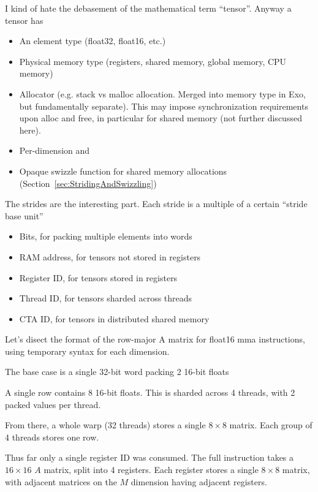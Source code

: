 
I kind of hate the debasement of the mathematical term ``tensor''.
Anyway a tensor has
\begin{itemize}
  \item An element type (float32, float16, etc.)
  \item Physical memory type (registers, shared memory, global memory, CPU memory)
  \item Allocator (e.g. stack vs malloc allocation. Merged into memory type in Exo, but fundamentally separate).
    This may impose synchronization requirements upon alloc and free, in particular for shared memory (not further discussed here).
  \item Per-dimension  and 
  \item Opaque swizzle function for shared memory allocations (Section~\ref{sec:StridingAndSwizzling})
\end{itemize}
The strides are the interesting part.
Each stride is a multiple of a certain ``stride base unit''
\begin{itemize}
  \item Bits, for packing multiple elements into words
  \item RAM address, for tensors not stored in registers
  \item Register ID, for tensors stored in registers
  \item Thread ID, for tensors sharded across threads
  \item CTA ID, for tensors in distributed shared memory
\end{itemize}
Let's disect the format of the row-major A matrix for float16 mma instructions,
using temporary syntax  for each dimension.

The base case is a single 32-bit word packing 2 16-bit floats



A single row contains 8 16-bit floats.
This is sharded across 4 threads, with 2 packed values per thread.



From there, a whole warp (32 threads) stores a single $8 \times 8$ matrix.
Each group of 4 threads stores one row.



Thus far only a single register ID was consumed.
The full instruction takes a $16 \times 16$ $A$ matrix, split into 4 registers.
Each register stores a single $8 \times 8$ matrix, with adjacent matrices on the $M$ dimension having adjacent registers.

